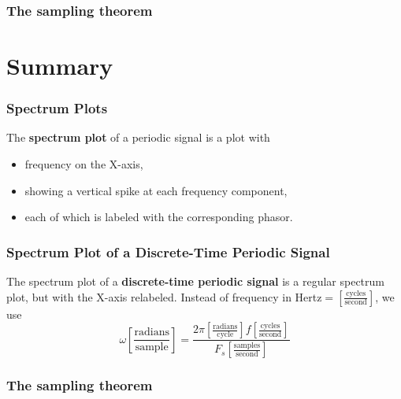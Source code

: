\documentclass{beamer}
\begin{document}
\begin{frame}
  \frametitle{The sampling theorem}

\end{frame}

\section[Summary]{Summary}
\setcounter{subsection}{1}

\begin{frame}
  \frametitle{Spectrum Plots}

  The {\bf spectrum plot} of a periodic signal is a plot with
  \begin{itemize}
  \item frequency on the X-axis,
  \item showing a vertical spike at each frequency component,
  \item each of which is labeled with the corresponding phasor.
  \end{itemize}
\end{frame}

\begin{frame}
  \frametitle{Spectrum Plot of a Discrete-Time Periodic Signal}

  The spectrum plot of a {\bf discrete-time periodic signal} is a
  regular spectrum plot, but with the X-axis relabeled.  Instead of
  frequency in Hertz$=\left[\frac{\mbox{cycles}}{\mbox{second}}\right]$, we use
    \begin{displaymath}
      \omega \left[\frac{\mbox{radians}}{\mbox{sample}}\right] =
      \frac{2\pi \left[\frac{\mbox{radians}}{\mbox{cycle}}\right]f\left[\frac{\mbox{cycles}}{\mbox{second}}\right]}{F_s\left[\frac{\mbox{samples}}{\mbox{second}}\right]}
    \end{displaymath}
\end{frame}

\begin{frame}
  \frametitle{The sampling theorem}

\end{frame}
\end{document}
